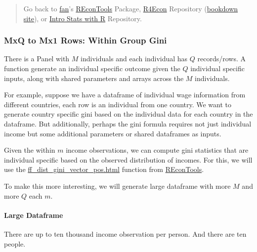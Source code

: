 \documentclass[
]{book}
\begin{document}
\begin{quote}
Go back to \href{http://fanwangecon.github.io/CodeDynaAsset/}{fan}'s \href{https://fanwangecon.github.io/REconTools/}{REconTools} Package, \href{https://fanwangecon.github.io/R4Econ/}{R4Econ} Repository (\href{https://fanwangecon.github.io/R4Econ/bookdown}{bookdown site}), or \href{https://fanwangecon.github.io/Stat4Econ/}{Intro Stats with R} Repository.
\end{quote}

\hypertarget{mxq-to-mx1-rows-within-group-gini}{%
\subsubsection{MxQ to Mx1 Rows: Within Group Gini}\label{mxq-to-mx1-rows-within-group-gini}}

There is a Panel with \(M\) individuals and each individual has \(Q\) records/rows. A function generate an individual specific outcome given the \(Q\) individual specific inputs, along with shared parameters and arrays across the \(M\) individuals.

For example, suppose we have a dataframe of individual wage information from different countries, each row is an individual from one country. We want to generate country specific gini based on the individual data for each country in the dataframe. But additionally, perhaps the gini formula requires not just individual income but some additional parameters or shared dataframes as inputs.

Given the within \(m\) income observations, we can compute gini statistics that are individual specific based on the observed distribution of incomes. For this, we will use the \href{https://fanwangecon.github.io/REconTools/reference/ff_dist_gini_vector_pos.html}{ff\_dist\_gini\_vector\_pos.html} function from \href{https://fanwangecon.github.io/REconTools/}{REconTools}.

To make this more interesting, we will generate large dataframe with more \(M\) and more \(Q\) each \(m\).

\hypertarget{large-dataframe}{%
\paragraph{Large Dataframe}\label{large-dataframe}}

There are up to ten thousand income observation per person. And there are ten people.
\end{document}
